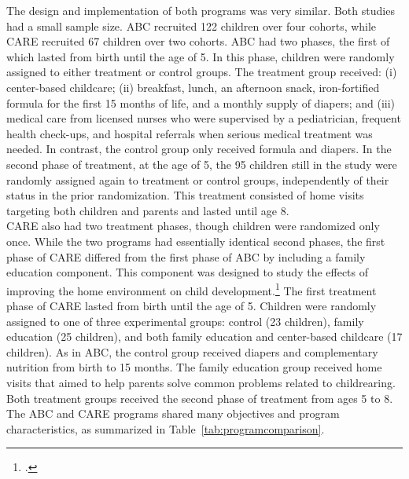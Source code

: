 \noindent The design and implementation of both programs was very similar. Both studies had a small sample size. ABC recruited 122 children over four cohorts, while CARE recruited 67 children over two cohorts. ABC had two phases, the first of which lasted from birth until the age of 5. In this phase, children were randomly assigned to either treatment or control groups. The treatment group received: (i) center-based childcare; (ii) breakfast, lunch, an afternoon snack, iron-fortified formula for the first 15 months of life, and a monthly supply of diapers; and (iii) medical care from licensed nurses who were supervised by a pediatrician, frequent health check-ups, and hospital referrals when serious medical treatment was needed. In contrast, the control group only received formula and diapers. In the second phase of treatment, at the age of 5, the 95 children still in the study were randomly assigned again to treatment or control groups, independently of their status in the prior randomization. This treatment consisted of home visits targeting both children and parents and lasted until age 8.\\ 

\noindent  CARE also had two treatment phases, though children were randomized only once. While the two programs had essentially identical second phases, the first phase of CARE differed from the first phase of ABC by including a family education component. This component was designed to study the effects of improving the home environment on child development.\footnote{\citet{Wasik_Ramey_etal_1990_CD}.} The first treatment phase of CARE lasted from birth until the age of 5. Children were randomly assigned to one of three experimental groups: control (23 children), family education (25 children), and both family education and center-based childcare (17 children). As in ABC, the control group received diapers and complementary nutrition from birth to 15 months. The family education group received home visits that aimed to help parents solve common problems related to childrearing. Both treatment groups received the second phase of treatment from ages 5 to 8. The ABC and CARE programs shared many objectives and program characteristics, as summarized in Table~\ref{tab:programcomparison}.\\



